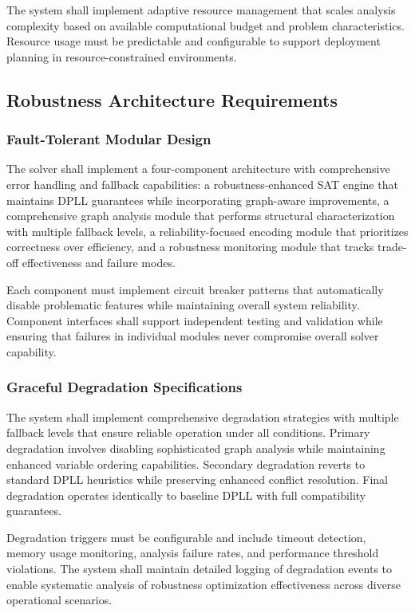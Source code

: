 The system shall implement adaptive resource management that scales analysis complexity based on available computational budget and problem characteristics. Resource usage must be predictable and configurable to support deployment planning in resource-constrained environments.

\subsection{Robustness Architecture Requirements}

\subsubsection{Fault-Tolerant Modular Design}
The solver shall implement a four-component architecture with comprehensive error handling and fallback capabilities: a robustness-enhanced SAT engine that maintains DPLL guarantees while incorporating graph-aware improvements, a comprehensive graph analysis module that performs structural characterization with multiple fallback levels, a reliability-focused encoding module that prioritizes correctness over efficiency, and a robustness monitoring module that tracks trade-off effectiveness and failure modes.

Each component must implement circuit breaker patterns that automatically disable problematic features while maintaining overall system reliability. Component interfaces shall support independent testing and validation while ensuring that failures in individual modules never compromise overall solver capability.

\subsubsection{Graceful Degradation Specifications}
The system shall implement comprehensive degradation strategies with multiple fallback levels that ensure reliable operation under all conditions. Primary degradation involves disabling sophisticated graph analysis while maintaining enhanced variable ordering capabilities. Secondary degradation reverts to standard DPLL heuristics while preserving enhanced conflict resolution. Final degradation operates identically to baseline DPLL with full compatibility guarantees.

Degradation triggers must be configurable and include timeout detection, memory usage monitoring, analysis failure rates, and performance threshold violations. The system shall maintain detailed logging of degradation events to enable systematic analysis of robustness optimization effectiveness across diverse operational scenarios.

